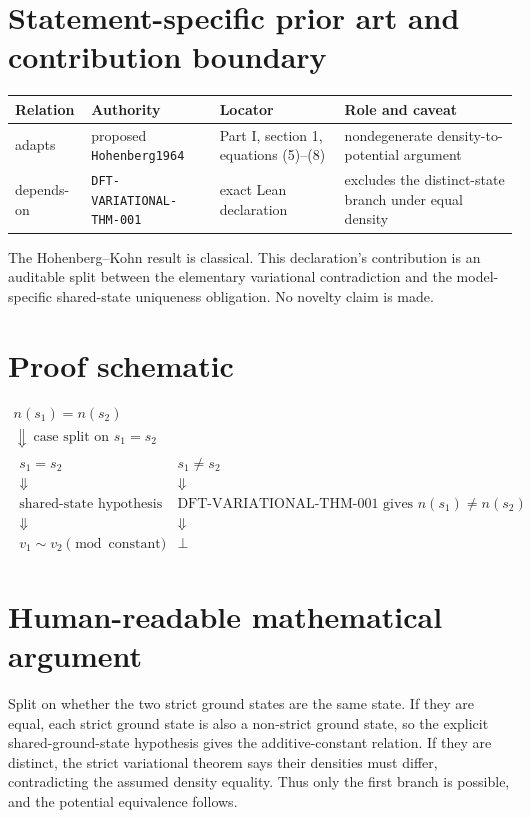\section{Statement-specific prior art and contribution boundary}
\begin{tabularx}{\textwidth}{@{}lYYY@{}}
\toprule
Relation & Authority & Locator & Role and caveat \\
\midrule
adapts & proposed \texttt{Hohenberg1964} & Part I, section 1, equations (5)--(8) & nondegenerate density-to-potential argument \\
depends-on & \texttt{DFT-VARIATIONAL-THM-001} & exact Lean declaration & excludes the distinct-state branch under equal density \\
\bottomrule
\end{tabularx}
The Hohenberg--Kohn result is classical.  This declaration's contribution is an auditable split
between the elementary variational contradiction and the model-specific shared-state uniqueness
obligation.  No novelty claim is made.

\section{Proof schematic}
\[
\begin{array}{c}
 n(s_1)=n(s_2)\\
 \Downarrow\ \text{case split on }s_1=s_2\\
 \begin{array}{cc}
 s_1=s_2 & s_1\ne s_2\\
 \Downarrow & \Downarrow\\
 \text{shared-state hypothesis} & \text{DFT-VARIATIONAL-THM-001 gives }n(s_1)\ne n(s_2)\\
 \Downarrow & \Downarrow\\
 v_1\sim v_2\pmod{\text{constant}} & \bot
 \end{array}
\end{array}
\]

\section{Human-readable mathematical argument}
Split on whether the two strict ground states are the same state.  If they are equal, each strict
ground state is also a non-strict ground state, so the explicit shared-ground-state hypothesis gives
the additive-constant relation.  If they are distinct, the strict variational theorem says their
densities must differ, contradicting the assumed density equality.  Thus only the first branch is
possible, and the potential equivalence follows.

